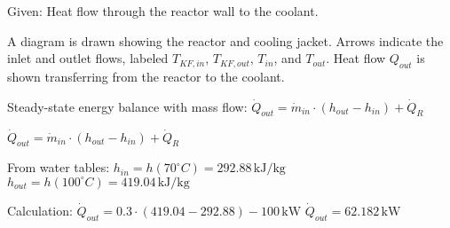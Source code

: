 Given: Heat flow through the reactor wall to the coolant.  

A diagram is drawn showing the reactor and cooling jacket. Arrows indicate the inlet and outlet flows, labeled \( T_{KF,in} \), \( T_{KF,out} \), \( T_{in} \), and \( T_{out} \). Heat flow \( Q_{out} \) is shown transferring from the reactor to the coolant.  

Steady-state energy balance with mass flow:  
\( \dot{Q}_{out} = \dot{m}_{in} \cdot (h_{out} - h_{in}) + \dot{Q}_R \)  

\( \dot{Q}_{out} = \dot{m}_{in} \cdot (h_{out} - h_{in}) + \dot{Q}_R \)  

From water tables:  
\( h_{in} = h(70^\circ C) = 292.88 \, \text{kJ/kg} \)  
\( h_{out} = h(100^\circ C) = 419.04 \, \text{kJ/kg} \)  

Calculation:  
\( \dot{Q}_{out} = 0.3 \cdot (419.04 - 292.88) - 100 \, \text{kW} \)  
\( \dot{Q}_{out} = 62.182 \, \text{kW} \)